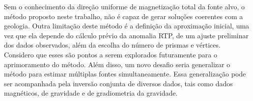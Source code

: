 Sem o conhecimento da direção uniforme de magnetização total da fonte alvo, o método proposto neste trabalho, não é capaz de gerar soluções coerentes com a geologia.
Outra limitação deste método é a definição da aproximação inicial, uma vez que ela depende do cálculo prévio da anomalia RTP, de um ajuste preliminar dos dados observados, além da escolha do número de prismas e vértices.
Considero que esses são pontos a serem explorados futuramente para o aprimoramento do método.
Além disso, um novo desafio seria generalizar o método para estimar múltiplas fontes simultaneamente.
Essa generalização pode ser acompanhada pela inversão conjunta de diversos dados, tais como dados magnéticos, de gravidade e de gradiometria da gravidade.